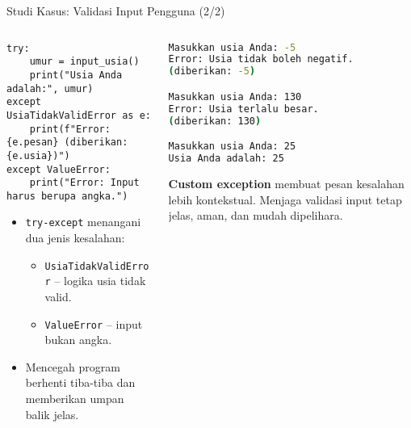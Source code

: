 \documentclass[aspectratio=169, table]{beamer}
\begin{document}
\begin{frame}[fragile]{Studi Kasus: Validasi Input Pengguna (2/2)}
\vspace*{10pt}
\begin{columns}[T,totalwidth=\textwidth]
\begin{column}{0.60\textwidth}
\begin{lstlisting}[style=PythonStyle, basicstyle=\ttfamily\scriptsize]
try:
    umur = input_usia()
    print("Usia Anda adalah:", umur)
except UsiaTidakValidError as e:
    print(f"Error: {e.pesan} (diberikan: {e.usia})")
except ValueError:
    print("Error: Input harus berupa angka.")
\end{lstlisting}

\begin{itemize}
  \item \texttt{try-except} menangani dua jenis kesalahan:
  \begin{itemize}
    \item \texttt{UsiaTidakValidError} – logika usia tidak valid.
    \item \texttt{ValueError} – input bukan angka.
  \end{itemize}
  \item Mencegah program berhenti tiba-tiba dan memberikan umpan balik jelas.
\end{itemize}
\end{column}

\begin{column}{0.35\textwidth}
\begin{lstlisting}[language=bash, basicstyle=\ttfamily\scriptsize]
Masukkan usia Anda: -5
Error: Usia tidak boleh negatif.
(diberikan: -5)

Masukkan usia Anda: 130
Error: Usia terlalu besar.
(diberikan: 130)

Masukkan usia Anda: 25
Usia Anda adalah: 25
\end{lstlisting}


\textbf{Custom exception} membuat pesan kesalahan lebih kontekstual.
Menjaga validasi input tetap jelas, aman, dan mudah dipelihara.

\end{column}
\end{columns}
\end{frame}
\end{document}
